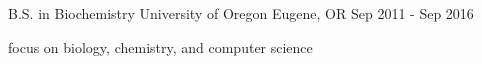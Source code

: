 

\begin{cventries}

  \cventry
    {B.S. in Biochemistry} %
    {University of Oregon} %
    {Eugene, OR} %
    {Sep 2011 - Sep 2016} %
    {
      \begin{cvitems} %
        \item focus on biology, chemistry, and computer science
      \end{cvitems}
    }

\end{cventries}
